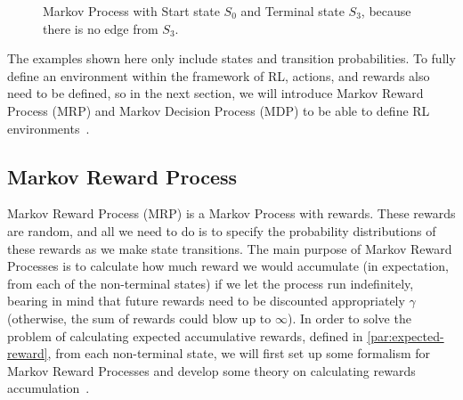 \documentclass[../xlapes02]{subfiles}
\begin{document}
    \begin{figure}[h!]
        \begin{center}
            \caption{Markov Process with Start state $S_0$ and Terminal state $S_3$, because there is no edge from $S_3$.}
            \label{fig:markov-process}
        \end{center}
        \centering
    \end{figure}

    The examples shown here only include states and transition probabilities. To fully define an environment within the framework of RL, actions, and rewards also need to be defined, so in the next section, we will introduce Markov Reward Process (MRP) and Markov Decision Process (MDP) to be able to define RL environments~\cite{sutton2018reinforcement}.

    \subsection{Markov Reward Process}\label{subsubsec:markov-reward-process}
    Markov Reward Process (MRP) is a Markov Process with rewards. These rewards are random, and all we need to do is to specify the probability distributions of these rewards as we make state transitions. The main purpose of Markov Reward Processes is to calculate how much reward we would accumulate (in expectation, from each of the non-terminal states) if we let the process run indefinitely, bearing in mind that future rewards need to be discounted appropriately $\gamma$ (otherwise, the sum of rewards could blow up to $\infty$). In order to solve the problem of calculating expected accumulative rewards, defined in \cref{par:expected-reward}, from each non-terminal state, we will first set up some formalism for Markov Reward Processes and develop some theory on calculating rewards accumulation~\cite{rao2022foundations}.
\end{document}
